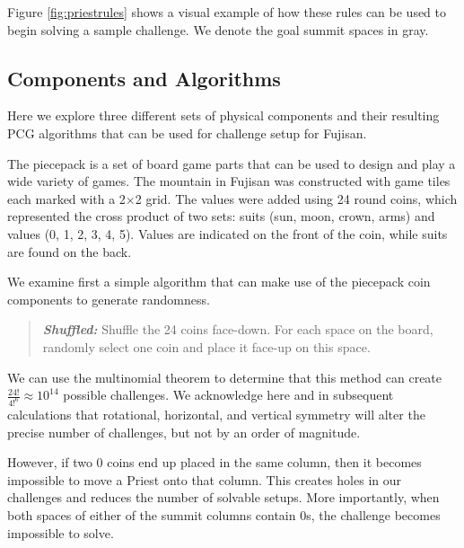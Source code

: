 \documentclass[journal]{IEEEtran}
\begin{document}
Figure \ref{fig:priestrules} shows a visual example of how these rules can be used to begin solving a sample challenge. We denote the goal summit spaces in gray. 

%
%

%

%
%
%
%
%
%
%

%

%
%
%
%
%
%

%

\subsection{Components and Algorithms}
\label{section:pcgalgs}
\noindent
Here we explore three different sets of physical components and their resulting PCG algorithms that can be used for challenge setup for Fujisan. 

The piecepack is a set of board game parts that can be used to design and play a wide variety of games\cite{GAMESYSTEM}. The mountain in Fujisan was constructed with game tiles each marked with a 2$\times$2 grid. The values were added using 24 round coins, which represented the cross product of two sets: suits (sun, moon, crown, arms) and values (0, 1, 2, 3, 4, 5). Values are indicated on the front of the coin, while suits are found on the back.

We examine first a simple algorithm that can make use of the piecepack coin components to generate randomness. 

\begin{quote}
    
  {\it \bf Shuffled:} Shuffle the 24 coins face-down. For each space on the board, randomly select one coin and place it face-up on this space.
  
\end{quote}

We can use the multinomial theorem to determine that this method can create
$\frac{24!}{4!^{6}} \approx 10^{14}$ possible challenges.  We acknowledge here and in subsequent calculations that rotational, horizontal, and vertical symmetry will alter the precise number of challenges, but not by an order of magnitude.

However, if two 0 coins end up placed in the same column, then it becomes impossible to move a Priest onto that column. This creates holes in our challenges and reduces the number of solvable setups. 
More importantly, when both spaces of either of the summit columns contain 0s, the challenge becomes impossible to solve.
\end{document}

